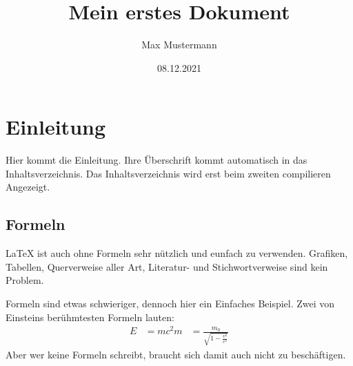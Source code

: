 \documentclass[a4paper,10pt]{scrartcl}
\title{Mein erstes Dokument}
\author{Max Mustermann}
\date{08.12.2021}
\begin{document}
\maketitle
\tableofcontents

\section{Einleitung}
Hier kommt die Einleitung. Ihre Überschrift kommt automatisch in das Inhaltsverzeichnis. Das Inhaltsverzeichnis wird erst beim zweiten compilieren Angezeigt.

\subsection{Formeln}
\LaTeX{} ist auch ohne Formeln sehr nützlich und eunfach zu verwenden. Grafiken, Tabellen, Querverweise aller Art, Literatur- und Stichwortverweise sind kein Problem.

Formeln sind etwas schwieriger, dennoch hier ein Einfaches Beispiel. Zwei von Einsteins berühmtesten Formeln lauten:
\begin{align}
E &= mc^2
m &= \frac{m_0}{\sqrt{1-\frac{v^2}{c^2}}}
\end{align}
Aber wer keine Formeln schreibt, braucht sich damit auch nicht zu beschäftigen.
\end{document}

